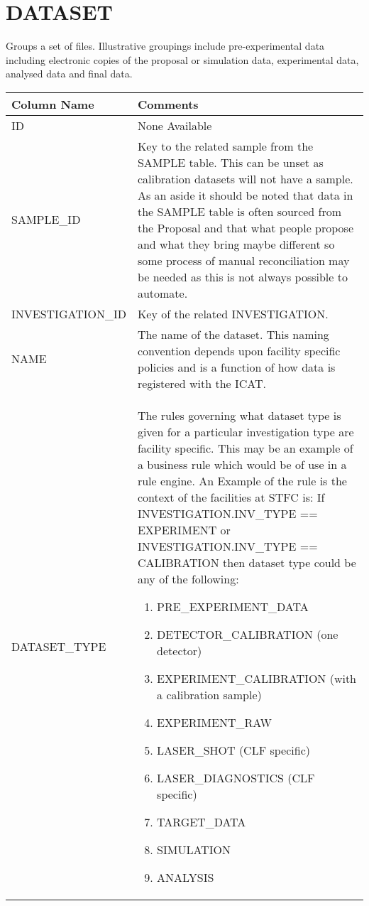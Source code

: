 \documentclass{report}
\begin{document}
\section{DATASET}

Groups a set of files. Illustrative groupings include pre-experimental data including electronic copies of the proposal or simulation data, experimental data, analysed data and final data.\\

\begin{tabular}{|l|l|}
\hline
Column Name & Comments \\ \hline
ID & \multicolumn{1}{p{100mm}|}{
None Available} \\ \hline
SAMPLE\_ID & \multicolumn{1}{p{100mm}|}{
Key to the related sample from the SAMPLE table. This can be unset as calibration datasets will not have a sample.  As an aside it should be noted that data in the SAMPLE table is often sourced from the Proposal and that what people propose and what they bring maybe different so some process of manual reconciliation may be needed as this is not always possible to automate.} \\ \hline
INVESTIGATION\_ID & \multicolumn{1}{p{100mm}|}{
Key of the related INVESTIGATION.} \\ \hline
NAME & \multicolumn{1}{p{100mm}|}{
The name of the dataset. This naming convention depends upon facility specific policies and is a function of how data is registered with the ICAT.} \\ \hline
DATASET\_TYPE & \multicolumn{1}{p{100mm}|}{
The rules governing what dataset type is given for a particular investigation type are facility specific. This may be an example of a business rule which would be of use in a rule engine. An Example of the rule is the context of the facilities at STFC is:  If INVESTIGATION.INV\_TYPE == EXPERIMENT or INVESTIGATION.INV\_TYPE == CALIBRATION  then dataset type could be any of the following: \begin{enumerate} \item PRE\_EXPERIMENT\_DATA \item DETECTOR\_CALIBRATION (one detector) \item EXPERIMENT\_CALIBRATION (with a calibration sample) \item EXPERIMENT\_RAW \item LASER\_SHOT (CLF specific) \item LASER\_DIAGNOSTICS (CLF specific) \item TARGET\_DATA \item SIMULATION \item ANALYSIS \end{enumerate}} \\ \hline

\end{tabular}
\end{document}

